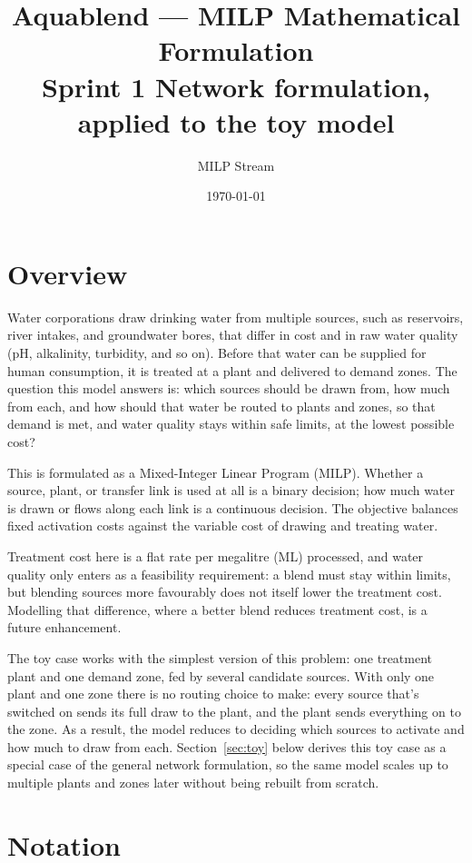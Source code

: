 \documentclass[10pt]{article}
\title{\textbf{Aquablend --- MILP Mathematical Formulation}\\[0.3em]
\large Sprint 1 \quad Network formulation, applied to the toy model}
\author{MILP Stream}
\date{\today}
\begin{document}
\maketitle

\section{Overview}

Water corporations draw drinking water from multiple sources, such as reservoirs, river intakes, and groundwater bores, that differ in cost and in raw water quality (pH, alkalinity, turbidity, and so on). Before that water can be supplied for human consumption, it is treated at a plant and delivered to demand zones. The question this model answers is: which sources should be drawn from, how much from each, and how should that water be routed to plants and zones, so that demand is met, and water quality stays within safe limits, at the lowest possible cost?

This is formulated as a Mixed-Integer Linear Program (MILP). Whether a source, plant, or transfer link is used at all is a binary decision; how much water is drawn or flows along each link is a continuous decision. The objective balances fixed activation costs against the variable cost of drawing and treating water.

Treatment cost here is a flat rate per megalitre (ML) processed, and water quality only enters as a feasibility requirement: a blend must stay within limits, but blending sources more favourably does not itself lower the treatment cost.
Modelling that difference, where a better blend reduces treatment cost, is a future enhancement.

The toy case works with the simplest version of this problem: one treatment plant and one demand zone, fed by several candidate sources. With only one plant and one zone there is no routing choice to make: every source that's switched on sends its full draw to the plant, and the plant sends everything on to the zone. As a result, the model reduces to deciding which sources to activate and how much to draw from each. Section~\ref{sec:toy} below derives this toy case as a special case of the general network formulation, so the same model scales up to multiple plants and zones later without being rebuilt
from scratch.


\section{Notation}
\end{document}
